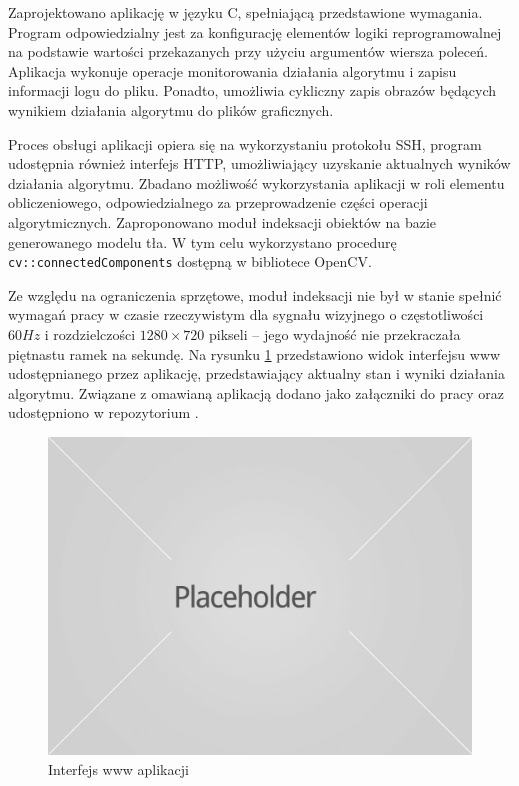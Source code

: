 Zaprojektowano aplikację w języku C, spełniającą przedstawione wymagania.
Program odpowiedzialny jest za konfigurację elementów logiki reprogramowalnej na podstawie wartości przekazanych przy użyciu argumentów wiersza poleceń. 
Aplikacja wykonuje operacje monitorowania działania algorytmu i zapisu informacji logu do pliku. %
Ponadto, umożliwia cykliczny zapis obrazów będących wynikiem działania algorytmu do plików graficznych. 

Proces obsługi aplikacji opiera się na wykorzystaniu protokołu SSH, program udostępnia również interfejs HTTP, umożliwiający uzyskanie aktualnych wyników działania algorytmu.
Zbadano możliwość wykorzystania aplikacji w roli elementu obliczeniowego, odpowiedzialnego za przeprowadzenie części operacji algorytmicznych. %
Zaproponowano moduł indeksacji obiektów na bazie generowanego modelu tła. 
W tym celu wykorzystano procedurę \texttt{cv::connectedComponents} dostępną w bibliotece OpenCV. %

Ze względu na ograniczenia sprzętowe, moduł indeksacji nie był w stanie spełnić wymagań pracy w czasie rzeczywistym dla sygnału wizyjnego o częstotliwości $60Hz$ i rozdzielczości $1280 \times 720 $ pikseli -- jego wydajność nie przekraczała piętnastu ramek na sekundę.
Na rysunku \ref{fig:background-buffer-www} przedstawiono widok interfejsu www udostępnianego przez aplikację, przedstawiający aktualny stan i wyniki działania algorytmu.
Związane z omawianą aplikacją dodano jako załączniki do pracy oraz udostępniono w repozytorium \cite{git-repository}.
\begin{figure}[!htb]
	\centering
	\includegraphics[width=12cm]{img/placeholder.jpg}
	\caption{Interfejs www aplikacji}
	\label{fig:background-buffer-www}
\end{figure}

